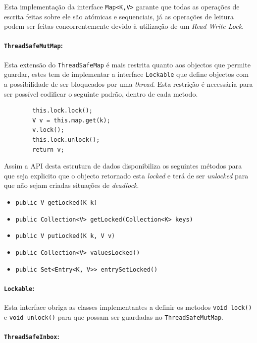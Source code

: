 \documentclass[a4paper]{article}
\begin{document}
Esta implementação da interface \texttt{Map<K,V>} garante que todas as operações de escrita feitas sobre ele são atómicas e sequenciais, já as operações de leitura podem ser feitas concorrentemente devido à utilização de um \textit{Read Write Lock}.

\paragraph{\texttt{ThreadSafeMutMap}:}

Esta extensão do \texttt{ThreadSafeMap} é mais restrita quanto aos objectos que permite guardar, estes tem de implementar a interface \texttt{Lockable} que define objectos com a possibilidade de ser bloqueados por uma \textit{thread}. Esta restrição é necessária para ser possível codificar o seguinte padrão, dentro de cada metodo.

    \begin{verbatim}
        this.lock.lock();
        V v = this.map.get(k);
        v.lock();
        this.lock.unlock();
        return v;
    \end{verbatim}

Assim a API desta estrutura de dados disponibiliza os seguintes métodos para que seja explicito que o objecto retornado esta \textit{locked} e terá de ser \textit{unlocked} para que não sejam criadas situações de \textit{deadlock}.

\begin{itemize}
    \item \texttt{public V getLocked(K k)}
    \item \texttt{public Collection<V> getLocked(Collection<K> keys)}
    \item \texttt{public V putLocked(K k, V v)}
    \item \texttt{public Collection<V> valuesLocked()}
    \item \texttt{public Set<Entry<K, V>> entrySetLocked()}
\end{itemize}

\paragraph{\texttt{Lockable}:}

Esta interface obriga as classes implementantes a definir os metodos \texttt{void lock()} e \texttt{void unlock()} para que possam ser guardadas no \texttt{ThreadSafeMutMap}.

\paragraph{\texttt{ThreadSafeInbox}:}
\end{document}
